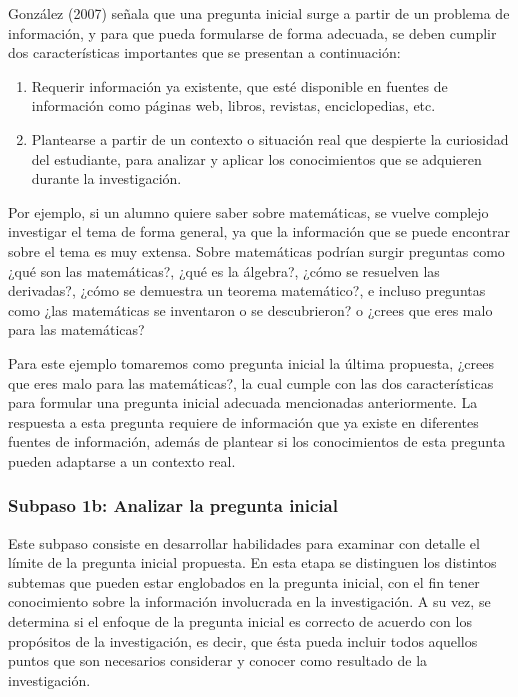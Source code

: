 González (2007) señala que una pregunta inicial surge a partir de un problema de información, y para que pueda formularse de forma adecuada, se deben cumplir dos características importantes que se presentan a continuación:

\begin{enumerate}
  \item Requerir información ya existente, que esté disponible en fuentes de información como páginas web, libros, revistas, enciclopedias, etc.
  \item Plantearse a partir de un contexto o situación real que despierte la curiosidad del estudiante, para analizar y aplicar los conocimientos que se adquieren durante la investigación.
\end{enumerate}

Por ejemplo, si un alumno quiere saber sobre matemáticas, se vuelve complejo investigar el tema de forma general, ya que la información que se puede encontrar sobre el tema es muy extensa. Sobre matemáticas podrían surgir preguntas como ¿qué son las matemáticas?, ¿qué es la álgebra?, ¿cómo se resuelven las derivadas?, ¿cómo se demuestra un teorema matemático?, e incluso preguntas como ¿las matemáticas se inventaron o se descubrieron? o ¿crees que eres malo para las matemáticas?

Para este ejemplo tomaremos como pregunta inicial la última propuesta, ¿crees que eres malo para las matemáticas?, la cual cumple con las dos características para formular una pregunta inicial adecuada mencionadas anteriormente. La respuesta a esta pregunta requiere de información que ya existe en diferentes fuentes de información, además de plantear si los conocimientos de esta pregunta pueden adaptarse a un contexto real.


\subsubsection{Subpaso 1b: Analizar la pregunta inicial}
\label{secPaso1bCap2}

Este subpaso consiste en desarrollar habilidades para examinar con detalle el límite de la pregunta inicial propuesta. En esta etapa se distinguen los distintos subtemas que pueden estar  englobados en la pregunta inicial, con el fin tener conocimiento sobre la información involucrada en la investigación. A su vez, se determina si el enfoque de la pregunta inicial es correcto de acuerdo con los propósitos de la investigación, es decir, que ésta pueda incluir todos aquellos puntos que son necesarios considerar y conocer como resultado de la investigación.

